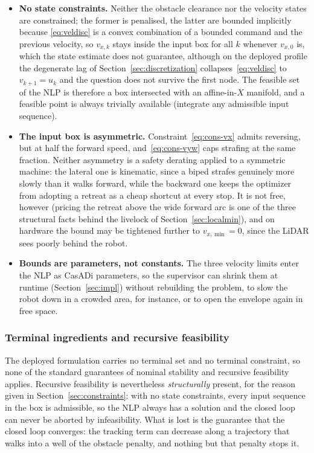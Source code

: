 \documentclass[11pt,a4paper]{article}
\begin{document}
\begin{itemize}
  \item \textbf{No state constraints.} Neither the obstacle clearance nor the velocity states are
        constrained; the former is penalised, the latter are bounded implicitly because
        \eqref{eq:veldisc} is a convex combination of a bounded command and the previous velocity, so
        $v_{x,k}$ stays inside the input box for all $k$ whenever $v_{x,0}$ is, which the state
        estimate does not guarantee, although on the deployed profile the degenerate lag of
        Section~\ref{sec:discretization} collapses~\eqref{eq:veldisc} to $v_{k+1}=u_k$ and the question
        does not survive the first node. The feasible set of the NLP is therefore a box intersected with
        an affine-in-$X$ manifold, and a feasible point is always trivially available (integrate any
        admissible input sequence).
  \item \textbf{The input box is asymmetric.} Constraint~\eqref{eq:cons-vx} admits reversing, but at half
        the forward speed, and~\eqref{eq:cons-vyw} caps strafing at the same fraction. Neither asymmetry
        is a safety derating applied to a symmetric machine: the lateral one is kinematic, since a biped
        strafes genuinely more slowly than it walks forward, while the backward one keeps the optimizer
        from adopting a retreat as a cheap shortcut at every stop. It is not free, however (pricing
        the retreat above the wide forward arc is one of the three structural facts behind the livelock
        of Section~\ref{sec:localmin}), and on hardware the bound may be tightened further to
        $v_{x,\min}=0$, since the LiDAR sees poorly behind the robot.
  \item \textbf{Bounds are parameters, not constants.} The three velocity limits enter the NLP as CasADi
        parameters, so the supervisor can shrink them at runtime (Section~\ref{sec:impl}) without
        rebuilding the problem, to slow the robot down in a crowded area, for instance, or to open the
        envelope again in free space.
\end{itemize}

\subsubsection{Terminal ingredients and recursive feasibility}
\label{sec:terminal}

The deployed formulation carries no terminal set and no terminal constraint, so none of the standard
guarantees of nominal stability and recursive feasibility \cite{mayne2000constrained,chen1998quasi} applies.
Recursive feasibility is nevertheless \emph{structurally} present, for the reason given in
Section~\ref{sec:constraints}: with no state constraints, every input sequence in the box is admissible, so
the NLP always has a solution and the closed loop can never be aborted by infeasibility. What is lost is the
guarantee that the closed loop converges: the tracking term can decrease along a trajectory that walks into
a well of the obstacle penalty, and nothing but that penalty stops it.
\end{document}
